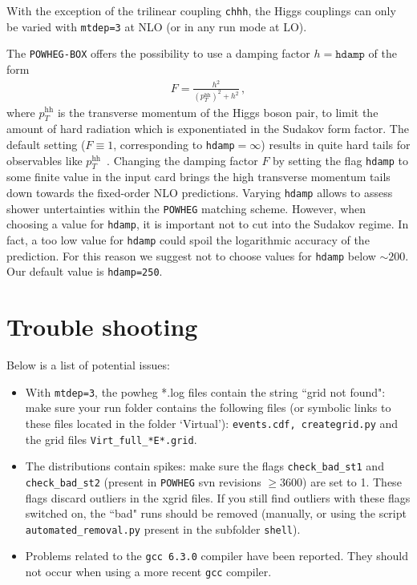 \documentclass[paper]{JHEP3}
\newcommand\POWHEG{{\tt POWHEG}}
\newcommand\POWHEGBOX{{\tt POWHEG-BOX}}
\newcommand\pthh{\ensuremath{p_{T}^{\mathrm{hh}}}\xspace}
\begin{document}
With the exception of the trilinear coupling {\tt chhh}, the Higgs couplings can only be varied with {\tt mtdep=3} at NLO (or in any run mode at LO).

The \POWHEGBOX{} offers the possibility to use a damping factor $h=\texttt{hdamp}$ of the
form~\cite{Alioli:2008tz,Alioli:2009je}
\begin{align}
  F=\frac{h^{2}}{(\pthh)^2+h^{2}}\,,
\end{align}
where \pthh is the transverse momentum of the Higgs boson pair, to
limit the amount of hard radiation which is exponentiated in the
Sudakov form factor. The default setting ($F\equiv1$, corresponding to {\tt hdamp}$=\infty$) results in
quite hard tails for observables like
$\pthh$~\cite{Heinrich:2017kxx}. Changing the damping factor $F$ by
setting the flag {\tt hdamp} to some finite value in the input
card brings the high transverse momentum tails down towards the fixed-order NLO
predictions. Varying {\tt hdamp} allows to assess shower untertainties
within the \POWHEG{} matching scheme. However, when choosing a value
for {\tt hdamp}, it is important not to cut into the Sudakov
regime. In fact, a too low value for {\tt hdamp} could spoil the
logarithmic accuracy of the prediction. For this reason we suggest not
to choose values for {\tt hdamp} below $\sim 200$. Our default value is  {\tt hdamp=250}.

\section{Trouble shooting}

Below is a list of potential issues:

\begin{itemize}
\item With {\tt mtdep=3}, the powheg *.log files contain the string ``grid not found": make sure your run folder contains the following files 
(or symbolic links to these files located in the folder `Virtual'): {\tt events.cdf, creategrid.py} and the grid files  {\tt Virt\_full\_*E*.grid}.
\item The distributions contain spikes: make sure the flags {\tt check\_bad\_st1} and {\tt check\_bad\_st2} (present in \POWHEG{} svn revisions $\geq 3600$) are set to 1. These flags discard outliers in the xgrid files. If you still find outliers with these flags switched on, the ``bad" runs should be removed 
(manually, or using the script {\tt automated\_removal.py} present in the subfolder {\tt shell}).
\item Problems related to the {\tt gcc 6.3.0} compiler have been reported. They should not occur when using a more recent {\tt gcc} compiler.
\end{itemize}
\end{document}
